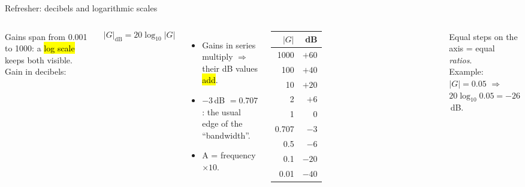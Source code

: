 \documentclass[aspectratio=169,10pt]{beamer}
\begin{document}
\begin{frame}{Refresher: decibels and logarithmic scales}
\begin{columns}[T]
\begin{defbox}
\footnotesize
Gains span from 0.001 to 1000: a \hl{log scale} keeps both visible. Gain in decibels:
\end{defbox}
\begin{eqbox}
\[
|G|_{\mathrm{dB}}=20\log_{10}|G|
\]
\end{eqbox}
\footnotesize
\begin{itemize}
  \item Gains in series multiply $\Rightarrow$ their dB values \hl{add}.
  \item $-3$\,dB $=0.707$: the usual edge of the ``bandwidth''.
  \item A  = frequency $\times10$.
\end{itemize}
\centering
\footnotesize
\begin{tabular}{@{}rr@{}}
\toprule
$|G|$ & dB\\
\midrule
1000 & $+60$\\
100 & $+40$\\
10 & $+20$\\
2 & $+6$\\
1 & $0$\\
0.707 & $-3$\\
0.5 & $-6$\\
0.1 & $-20$\\
0.01 & $-40$\\
\bottomrule
\end{tabular}
\centering
{}\\[4mm]
\footnotesize\raggedright
Equal steps on the axis = equal \emph{ratios}.\\[2pt]
Example: $|G|=0.05$ $\Rightarrow$ $20\log_{10}0.05=-26$\,dB.
\end{columns}
\end{frame}
\end{document}
